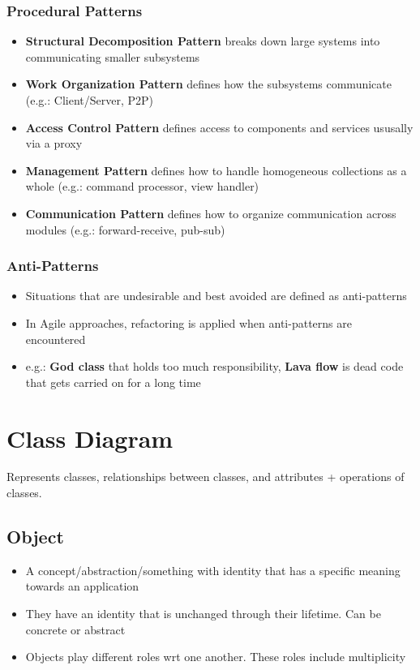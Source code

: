 \documentclass{article}
\begin{document}
\subsubsection{Procedural Patterns}
\begin{itemize}
    \item \textbf{Structural Decomposition Pattern} breaks down large systems into communicating smaller subsystems 
    
    \item \textbf{Work Organization Pattern} defines how the subsystems communicate (e.g.: Client/Server, P2P)
    
    \item \textbf{Access Control Pattern} defines access to components and services ususally via a proxy
    
    \item \textbf{Management Pattern} defines how to handle homogeneous collections as a whole (e.g.: command processor, view handler)
    
    \item \textbf{Communication Pattern} defines how to organize communication across modules (e.g.: forward-receive, pub-sub)
\end{itemize}

\subsubsection{Anti-Patterns}
\begin{itemize}
    \item Situations that are undesirable and best avoided are defined as anti-patterns
    
    \item In Agile approaches, refactoring is applied when anti-patterns are encountered
    
    \item e.g.: \textbf{God class} that holds too much responsibility, \textbf{Lava flow} is dead code that gets carried on for a long time 
\end{itemize}

\section{Class Diagram}
Represents classes, relationships between classes, and attributes + operations of classes.
\subsection{Object}
\begin{itemize}
    \item A concept/abstraction/something with identity that has a specific meaning towards an application
    
    \item They have an identity that is unchanged through their lifetime. Can be concrete or abstract
    
    \item Objects play different roles wrt one another. These roles include multiplicity
\end{itemize}
\end{document}
